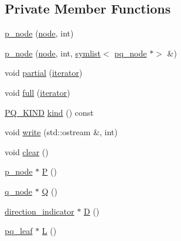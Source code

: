 \subsection*{Private Member Functions}
\begin{DoxyCompactItemize}
\item 
\mbox{\hyperlink{classp__node_aeaaa3a6bac1f72214880508f2d653939}{p\+\_\+node}} (\mbox{\hyperlink{classnode}{node}}, int)
\item 
\mbox{\hyperlink{classp__node_a043eab88f783cf3e3928fa1986a91ff6}{p\+\_\+node}} (\mbox{\hyperlink{classnode}{node}}, int, \mbox{\hyperlink{classsymlist}{symlist}}$<$ \mbox{\hyperlink{classpq__node}{pq\+\_\+node}} $\ast$$>$ \&)
\item 
void \mbox{\hyperlink{classp__node_a217e83b61144fe6b64e3fbade0aecfcf}{partial}} (\mbox{\hyperlink{classpq__node_a34898c9eb1527787c07e8ebefd6bfba5}{iterator}})
\item 
void \mbox{\hyperlink{classp__node_a0ba10aa3a56e26676d78af2e05fb5cd1}{full}} (\mbox{\hyperlink{classpq__node_a34898c9eb1527787c07e8ebefd6bfba5}{iterator}})
\item 
\mbox{\hyperlink{classpq__node_a96827bdca8bf81d20213405dd27f8fa6}{P\+Q\+\_\+\+K\+I\+ND}} \mbox{\hyperlink{classp__node_a58cceed9fc9d92f36ec3fb6425d99cec}{kind}} () const
\item 
void \mbox{\hyperlink{classp__node_a746285e60e6a8ab147ad11df78cdb8ea}{write}} (std\+::ostream \&, int)
\item 
void \mbox{\hyperlink{classp__node_af24fe11743b0836b03c108a1bf8a0995}{clear}} ()
\item 
\mbox{\hyperlink{classp__node}{p\+\_\+node}} $\ast$ \mbox{\hyperlink{classp__node_a4d8d7a171935a008f0718275dede2b43}{P}} ()
\item 
\mbox{\hyperlink{classq__node}{q\+\_\+node}} $\ast$ \mbox{\hyperlink{classp__node_a93d94db17c833adaaf66bacbc8f55cec}{Q}} ()
\item 
\mbox{\hyperlink{classdirection__indicator}{direction\+\_\+indicator}} $\ast$ \mbox{\hyperlink{classp__node_a1853a9f63b6a81e502db0b3ef5a49ada}{D}} ()
\item 
\mbox{\hyperlink{classpq__leaf}{pq\+\_\+leaf}} $\ast$ \mbox{\hyperlink{classp__node_a350eef32dca1dd9cf8cbb2771b4f3c9b}{L}} ()
\end{DoxyCompactItemize}
